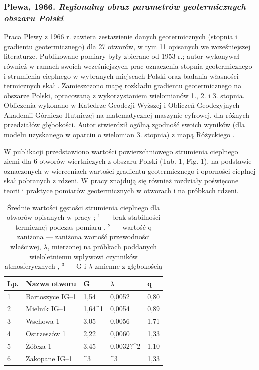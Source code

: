 \documentclass[11.5pt,twoside]{report}
\newcommand{\ct}[1]{\ignorespaces} %
\begin{document}
\subsubsection{Plewa, 1966. \textit{Regionalny obraz parametrów geotermicznych obszaru Polski}}
Praca Plewy z 1966 r. zawiera zestawienie danych geotermicznych (stopnia i gradientu geotermicznego) dla 27 otworów, w tym 11 opisanych we wcześniejszej literaturze. Publikowane pomiary były zbierane od 1953 r.; autor wykonywał również w ramach swoich wcześniejszych prac oznaczenia stopnia geotermicznego i strumienia cieplnego w wybranych miejscach Polski oraz badania własności termicznych skał \ct{parencite{Plewa.1961,Plewa.1963a,Plewa.1963b,Plewa.1965}}. Zamieszczono mapę rozkładu gradientu geotermicznego na obszarze Polski, opracowaną z wykorzystaniem wielomianów 1., 2. i 3. stopnia. Obliczenia wykonano w Katedrze Geodezji Wyższej i Obliczeń Geodezyjnych Akademii Górniczo-Hutniczej na matematycznej maszynie cyfrowej, dla różnych przedziałów głębokości. Autor stwierdził ogólną zgodność swoich wyników (dla modelu uzyskanego w oparciu o wielomian 3. stopnia) z mapą Różyckiego \citeyear{Rozycki.1948}. 

W publikacji przedstawiono wartości powierzchniowego strumienia cieplnego ziemi dla 6 otworów wiertniczych z obszaru Polski (Tab. 1, Fig. 1), na podstawie oznaczonych w wierceniach wartości gradientu geotermicznego i oporności cieplnej skał pobranych z rdzeni. W pracy znajdują się również rozdziały poświęcone teorii i praktyce pomiarów geotermicznych w otworach i na próbkach rdzeni. 

\begin{table}[h]
	\centering
	\caption{Średnie wartości gęstości strumienia cieplnego dla otworów opisanych w pracy \cite{Plewa.1966}; ${}^{1}$ --- brak stabilności termicznej podczas pomiaru \parencite{Plewa.1994}, ${}^{2}$ --- wartość q zaniżona --- zaniżona wartość przewodności właściwej, $\lambda$, mierzonej na próbkach poddanych wieloletniemu wpływowi czynników atmosferycznych \parencite{Plewa.1994}, ${}^{3}$ --- G i $\lambda$ zmienne z głębokością \parencite{Plewa.1966}}
	\label{my-label}
	\begin{tabular}{@{}lllll@{}}
		\toprule
		Lp. & Nazwa otworu     & G    & $\lambda$ & q    \\ \midrule
		1   & Bartoszyce IG--1 & 1,54 & 0,0052                 & 0,80 \\
		2   & Mielnik IG--1    & {1,64}^{1} & 0,0054                 & 0,89 \\
		3   & Wschowa 1        & 3,05 & 0,0056                 & 1,71 \\
		4   & Ostrzeszów 1     & 2,22 & 0,0060                 & 1,33 \\
		5   & Żółcza 1        & 3,45 & {0,0032?}^{2}                & 1,10 \\

		6   & Zakopane IG--1   & {}^{3}    & {}^{3}                      & 1,33 \\ \bottomrule
	\end{tabular}
\end{table}
\end{document}
